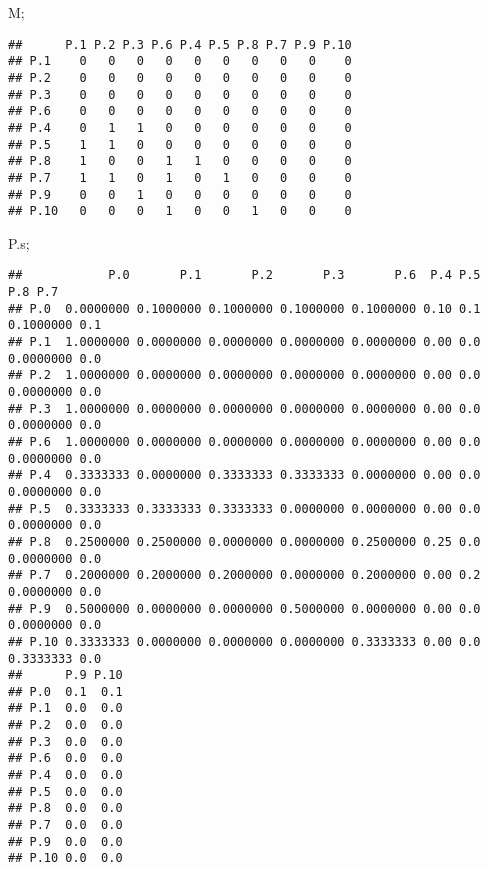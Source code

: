 \documentclass[
]{article}
\newenvironment{Shaded}{\begin{snugshade}}{\end{snugshade}}
\newcommand{\NormalTok}[1]{#1}
\begin{document}
\begin{Shaded}
\begin{Highlighting}[]
\NormalTok{M;}
\end{Highlighting}
\end{Shaded}

\begin{verbatim}
##      P.1 P.2 P.3 P.6 P.4 P.5 P.8 P.7 P.9 P.10
## P.1    0   0   0   0   0   0   0   0   0    0
## P.2    0   0   0   0   0   0   0   0   0    0
## P.3    0   0   0   0   0   0   0   0   0    0
## P.6    0   0   0   0   0   0   0   0   0    0
## P.4    0   1   1   0   0   0   0   0   0    0
## P.5    1   1   0   0   0   0   0   0   0    0
## P.8    1   0   0   1   1   0   0   0   0    0
## P.7    1   1   0   1   0   1   0   0   0    0
## P.9    0   0   1   0   0   0   0   0   0    0
## P.10   0   0   0   1   0   0   1   0   0    0
\end{verbatim}

\begin{Shaded}
\begin{Highlighting}[]
\NormalTok{P.s;}
\end{Highlighting}
\end{Shaded}

\begin{verbatim}
##            P.0       P.1       P.2       P.3       P.6  P.4 P.5       P.8 P.7
## P.0  0.0000000 0.1000000 0.1000000 0.1000000 0.1000000 0.10 0.1 0.1000000 0.1
## P.1  1.0000000 0.0000000 0.0000000 0.0000000 0.0000000 0.00 0.0 0.0000000 0.0
## P.2  1.0000000 0.0000000 0.0000000 0.0000000 0.0000000 0.00 0.0 0.0000000 0.0
## P.3  1.0000000 0.0000000 0.0000000 0.0000000 0.0000000 0.00 0.0 0.0000000 0.0
## P.6  1.0000000 0.0000000 0.0000000 0.0000000 0.0000000 0.00 0.0 0.0000000 0.0
## P.4  0.3333333 0.0000000 0.3333333 0.3333333 0.0000000 0.00 0.0 0.0000000 0.0
## P.5  0.3333333 0.3333333 0.3333333 0.0000000 0.0000000 0.00 0.0 0.0000000 0.0
## P.8  0.2500000 0.2500000 0.0000000 0.0000000 0.2500000 0.25 0.0 0.0000000 0.0
## P.7  0.2000000 0.2000000 0.2000000 0.0000000 0.2000000 0.00 0.2 0.0000000 0.0
## P.9  0.5000000 0.0000000 0.0000000 0.5000000 0.0000000 0.00 0.0 0.0000000 0.0
## P.10 0.3333333 0.0000000 0.0000000 0.0000000 0.3333333 0.00 0.0 0.3333333 0.0
##      P.9 P.10
## P.0  0.1  0.1
## P.1  0.0  0.0
## P.2  0.0  0.0
## P.3  0.0  0.0
## P.6  0.0  0.0
## P.4  0.0  0.0
## P.5  0.0  0.0
## P.8  0.0  0.0
## P.7  0.0  0.0
## P.9  0.0  0.0
## P.10 0.0  0.0
\end{verbatim}
\end{document}
